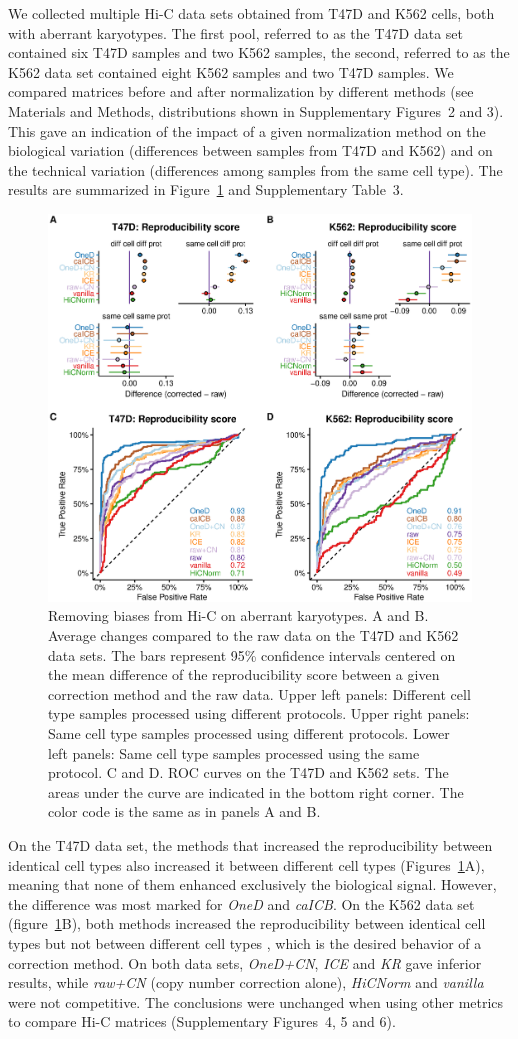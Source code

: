 \documentclass[a4,center,fleqn]{NAR}
\providecommand{\DIFadd}[1]{{\protect\color{red}#1}} %
\providecommand{\DIFdel}[1]{{\protect}}                      %
\providecommand{\DIFaddbegin}{} %
\providecommand{\DIFaddend}{} %
\providecommand{\DIFdelbegin}{} %
\providecommand{\DIFdelend}{} %
\begin{document}
We collected multiple Hi-C data sets obtained from T47D and K562 cells,
both with aberrant karyotypes. The first pool, referred to as the T47D data
set contained six T47D samples and two K562 samples, the second, referred
to as the K562 data set contained eight K562 samples and two T47D samples.
We compared matrices before and after normalization by different methods
(see Materials and Methods, distributions shown in Supplementary Figures~2
and 3). This gave an indication of the impact of a given normalization
method on the biological variation (differences between samples from T47D
and K562) and on the technical variation (differences among samples from
the same cell type). The results are summarized in
Figure~\ref{fig:aberrant} and Supplementary Table~3.

\begin{figure}
\centerline{\includegraphics[width=.49\textwidth]{figure_2.eps}}
\caption{Removing biases from Hi-C on aberrant karyotypes. A and B.
Average changes compared to the raw data on the T47D and K562 data sets.
The bars represent 95\% confidence intervals centered on the mean
difference of the reproducibility score between a given correction method
and the raw data. Upper left panels: Different cell type samples
processed using different protocols. Upper right panels: Same cell
type samples processed using different protocols. Lower left panels:
Same cell type samples processed using the same protocol. C and D. ROC
curves on the T47D and K562 sets. The areas under the curve are
indicated in the bottom right corner. The color code is the same as in
panels A and B.}
\label{fig:aberrant}
\end{figure}

On the T47D data set, the methods that increased the reproducibility
between identical cell types also increased it between different cell
types (Figures~\ref{fig:aberrant}A), meaning that none of them enhanced
exclusively the biological signal. However, the difference was most marked
for \textit{OneD} and \textit{caICB}. On the K562 data set
(figure~\ref{fig:aberrant}B), both methods increased the reproducibility
between identical cell types but not between different cell types
, which is the desired behavior of a
correction method. On both data sets, \textit{OneD+CN}, \textit{ICE} and
\textit{KR} gave inferior results, while \textit{raw+CN} (copy number
correction alone), \textit{\DIFdelbegin \DIFdel{LGF}\DIFdelend \DIFaddbegin \DIFadd{HiCNorm}\DIFaddend } and \textit{vanilla} were not competitive.
The conclusions were unchanged when using other metrics to compare Hi-C
matrices (Supplementary Figures~4, 5 and 6).
\end{document}
